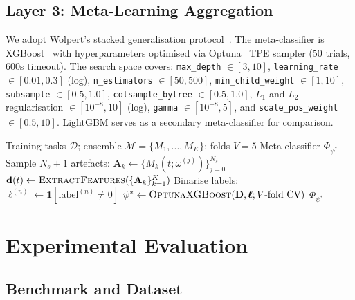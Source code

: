 \documentclass[runningheads]{llncs}
\begin{document}
\subsection{Layer 3: Meta-Learning Aggregation}

We adopt Wolpert's stacked generalisation protocol~\cite{wolpert1992stacking}. The meta-classifier is XGBoost~\cite{chen2016xgboost} with hyperparameters optimised via Optuna~\cite{akiba2019optuna} TPE sampler (50 trials, 600s timeout). The search space covers: \texttt{max\_depth} $\in [3,10]$, \texttt{learning\_rate} $\in [0.01, 0.3]$ (log), \texttt{n\_estimators} $\in [50, 500]$, \texttt{min\_child\_weight} $\in [1, 10]$, \texttt{subsample} $\in [0.5, 1.0]$, \texttt{colsample\_bytree} $\in [0.5, 1.0]$, $L_1$ and $L_2$ regularisation $\in [10^{-8}, 10]$ (log), \texttt{gamma} $\in [10^{-8}, 5]$, and \texttt{scale\_pos\_weight} $\in [0.5, 10]$. LightGBM serves as a secondary meta-classifier for comparison.

\begin{algorithm}[t]
\caption{EMHD: Training Pipeline}
\label{alg:training}
\begin{algorithmic}[1]
\REQUIRE Training tasks $\mathcal{D}$; ensemble $\mathcal{M} = \{M_1,...,M_K\}$; folds $V=5$
\ENSURE Meta-classifier $\Phi_{\psi^*}$
    \STATE Sample $N_s + 1$ artefacts: $\mathbf{A}_k \leftarrow \{M_k(t;\omega^{(j)})\}_{j=0}^{N_s}$
  \ENDFOR
  \STATE $\mathbf{d}(t) \leftarrow \textsc{ExtractFeatures}(\{\mathbf{A}_k\}_{k=1}^K)$
  \hfill{}
\ENDFOR
\STATE Binarise labels: $\ell^{(n)} \leftarrow \mathbf{1}[\text{label}^{(n)} \neq 0]$
\STATE $\psi^* \leftarrow \textsc{OptunaXGBoost}(\mathbf{D}, \boldsymbol{\ell}; V\text{-fold CV})$
\hfill{}
\RETURN $\Phi_{\psi^*}$
\end{algorithmic}
\end{algorithm}


\section{Experimental Evaluation}
\label{sec:eval}

\subsection{Benchmark and Dataset}
\label{sec:dataset}
\end{document}
